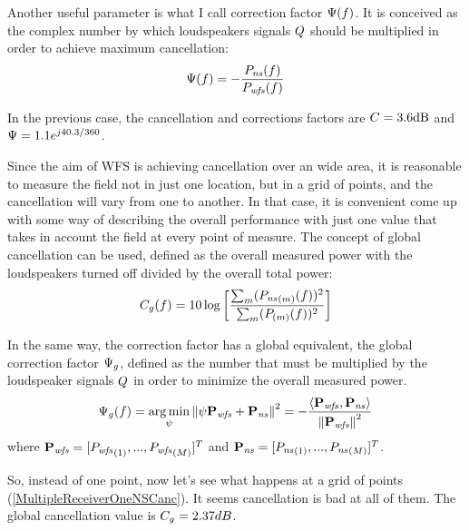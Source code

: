 Another useful parameter is what I call correction factor $\correctionFactor(f)$. It is conceived as the complex number by which loudspeakers signals $\signal[wfs][frequency]$ should be multiplied in order to achieve maximum cancellation:
\begin{equation}
\correctionFactor(f) = -\frac{\Field[ns][frequency](f)}{\Field[wfs][frequency](f)}
\end{equation}

In the previous case, the cancellation and corrections factors are $\cancellation = 3.6\si{dB}$ and $\correctionFactor = 1.1 e^{j40.3/360}$.

Since the aim of WFS is achieving cancellation over an wide area, it is reasonable to measure the field not in just one location, but in a grid of points, and the cancellation will vary from one to another. In that case, it is convenient come up with some way of describing the overall performance with just one value that takes in account the field at every point of measure. The concept of global cancellation can be used, defined as the overall measured power with the loudspeakers turned off divided by the overall total power:
\begin{equation}
\globalCancellation(f) = 10 \log \left[\frac{\sum_m (\Field[ns][frequency][scalar][m](f))^2}{\sum_m (\Field[total][frequency][scalar][m](f))^2}\right]
\end{equation}

In the same way, the correction factor has a global equivalent, the global correction factor $\globalCorrectionFactor$, defined as the number that must be multiplied by the loudspeaker signals $\signal[wfs][frequency]$ in order to minimize the overall measured power.
\begin{equation}
\globalCorrectionFactor(f) = \argmin_{\psi} \norm{\psi \Field[wfs][frequency][vector] + \Field[ns][frequency][vector]}^2 = -\frac{\scalarProd{\Field[wfs][frequency][vector]}{\Field[ns][frequency][vector]}}{\norm{\Field[wfs][frequency][vector]}^2}
\end{equation}
where $\Field[wfs][frequency][vector] = [\Field[wfs][frequency][scalar][1],...,\Field[wfs][frequency][scalar][\numMeasPoints]]^T$ and $\Field[ns][frequency][vector] = [\Field[ns][frequency][scalar][1],...,\Field[ns][frequency][scalar][\numMeasPoints]]^T$.

So, instead of one point, now let's see what happens at a grid of points (\autoref{MultipleReceiverOneNSCanc}). It seems cancellation is bad at all of them. The global cancellation value is $\globalCancellation = 2.37 dB$. 

